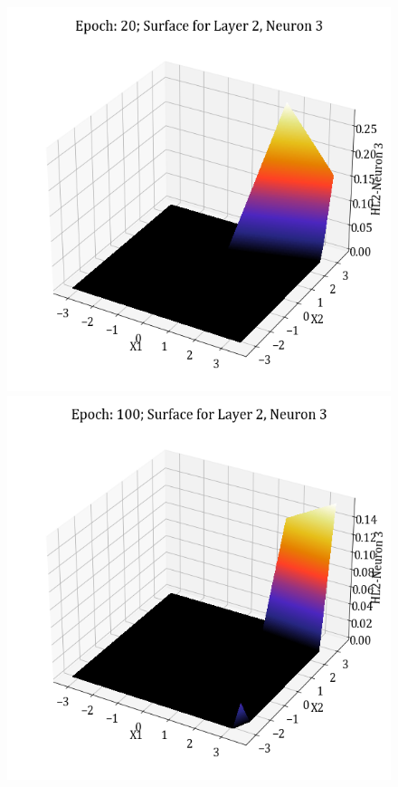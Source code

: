 \documentclass[11pt,a4paper]{article}
\begin{document}
\begin{figure}[H]
    \includegraphics[scale=0.4]{images/1B_MLFFNN_E20_HL2_N3.png}
    \includegraphics[scale=0.4]{images/1B_MLFFNN_E100_HL2_N3.png}

\end{figure}
\end{document}
